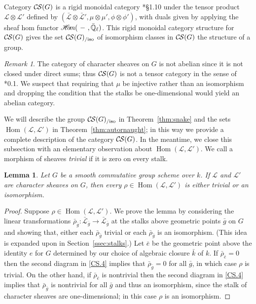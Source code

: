 \documentclass[10pt]{amsart}
\theoremstyle{plain}
\newtheorem{lemma}[theorem]{Lemma}
\theoremstyle{definition}
\theoremstyle{remark}
\newtheorem{remark}[theorem]{Remark}
\newcommand{\EE}{\mathbb{\bar Q}_\ell}
\newcommand{\bFq}{\bar{k}}
\newcommand{\Fq}{k}
\DeclareMathOperator{\Hom}{Hom}
\newcommand{\sheafHom}{{\mathscr{H}\hskip-4pt{\it o}\hskip-2pt{\it m}}}
\newcommand{\cs}[1]{{\mathcal{#1}}}
\newcommand{\gcs}[1]{{\mathcal{\bar #1}}}
\newcommand{\CS}{{\mathcal{C\hskip-0.8pt S}}}
\newcommand{\CSiso}[1]{\CS(#1)_{/\text{iso}}}
\newcommand{\brho}{{\bar\rho}}
\begin{document}
Category $\CS(G)$ is a rigid monoidal category
\cite{etingof:09a}*{\S1.10} under the tensor product
$\cs{L} \otimes \cs{L'}$ defined by $(\gcs{L}\otimes\gcs{L'}, \mu\otimes\mu', \phi\otimes \phi')$,
with duals given by applying the sheaf hom functor
$\sheafHom(\ - \ ,\EE)$.
This rigid monoidal category structure for $\CS(G)$ gives the set $\CSiso{G}$
of isomorphism classes in $\CS(G)$ the structure of a group.

\begin{remark}
The category of character sheaves on $G$ is not abelian since it is not closed under direct sums; 
thus $\CS(G)$ is not a tensor category in the sense of \cite{deligne:02a}*{0.1}.  
We suspect that requiring that $\mu$ be injective rather than
an isomorphism and dropping the condition that the stalks be one-dimensional would yield an abelian category.
\end{remark}

We will describe the group $\CSiso{G}$ in Theorem~\ref{thm:snake}
and the sets $\Hom(\cs{L},\cs{L}')$ in Theorem~\ref{thm:autornaught}; in this way we provide a complete description of the category $\CS(G)$.
%
In the meantime, we close this subsection with an elementary observation about $\Hom(\cs{L},\cs{L}')$.
We call a morphism of sheaves \emph{trivial} if it is zero on every stalk.

\begin{lemma}\label{lem:autornaught}
Let $G$ be a smooth commutative group scheme over $\Fq$.
If $\cs{L}$ and $\cs{L}'$ are character sheaves on $G$, then
every $\rho\in \Hom(\cs{L},\cs{L}')$ is either trivial or an isomorphism. 
\end{lemma}

\begin{proof}
Suppose $\rho \in \Hom(\cs{L},\cs{L}')$.
We prove the lemma by considering the linear transformations $\brho_{\bar g} : \gcs{L}_{\bar g} \to \gcs{L}_{\bar g}$ at the stalks above geometric points ${\bar g}$ on $G$ and showing that, either each $\brho_{\bar g}$ trivial or each $\brho_{\bar g}$ is an isomorphism.
(This idea is expanded upon in Section~\ref{ssec:stalks}.)
Let ${\bar e}$ be the geometric point above the identity $e$ for $G$ determined by our choice of algebraic closure $\bFq$ of $\Fq$.
If $\brho_{\bar e} = 0$ then the second diagram in \ref{CS.4} implies that $\brho_{\bar g} = 0$ for all ${\bar g}$, in which case $\rho$ is trivial.
On the other hand, if $\brho_{\bar e}$ is nontrivial then the second diagram in \ref{CS.4}  implies that $\brho_{\bar g}$ is nontrivial for all ${\bar g}$ and thus an isomorphism, since the stalk of character sheaves are one-dimensional; in this case $\rho$ is an isomorphism.
\end{proof}
\end{document}
